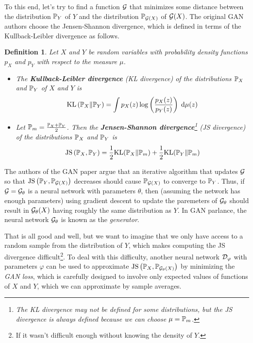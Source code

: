 \documentclass{article}
\newcommand{\dee}{\;\mathrm{d}}
\newtheorem{defn}{Definition}
\begin{document}
	\newcommand{\jsd}{\mathrm{JS}}
	\newcommand{\kld}{\mathrm{KL}}
	To this end, let's try to find a function \(\mathcal{G}\) that minimizes some distance between the distribution \(\mathbb{P}_Y\) of \(Y\) and the distribution \(\mathbb{P}_{\mathcal{G}(X)}\) of \(\mathcal{G}(X)\). The original GAN authors \cite{GAN} choose the Jensen-Shannon divergence, which is defined in terms of the Kullback-Leibler divergence as follows.
	\begin{defn}\label{def:kl_js_divergence}
		Let \(X\) and \(Y\) be random variables with probability density functions \(p_X\) and \(p_Y\) with respect to the measure \(\mu\).
		\begin{itemize}
			\item The \textbf{Kullback-Leibler divergence} (KL divergence) of the distributions \(\mathbb{P}_X\) and \(\mathbb{P}_Y\) of \(X\) and \(Y\) is
			\begin{equation}\label{eq:kl_div}
				\kld\left(\prob_X \Vert \prob_Y\right) = \int p_X(z) \log\left(\frac{p_X(z)}{p_Y(z)}\right) \dee \mu(z)
			\end{equation}
			\item Let \(\mathbb{P}_m = \frac{\mathbb{P}_X + \mathbb{P}_Y}{2}\). Then the \textbf{Jensen-Shannon divergence}\footnote{The KL divergence may not be defined for some distributions, but the JS divergence is always defined because we can choose \(\mu = \mathbb{P}_m\).} (JS divergence) of the distributions \(\mathbb{P}_X\) and \(\mathbb{P}_Y\) is
			\begin{equation}\label{eq:js_div}
				\jsd\left(\prob_X, \prob_Y\right) = \frac{1}{2}\kld(\prob_X \Vert\prob_m) + \frac{1}{2}\kld(\prob_Y \Vert \prob_m)
			\end{equation}
		\end{itemize}
	\end{defn}
	The authors of the GAN paper argue that an iterative algorithm that updates \(\mathcal{G}\) so that \(\jsd\left(\prob_Y, \prob_{\generator(X)}\right)\) decreases should cause \(\mathbb{P}_{\mathcal{G}(X)}\) to converge to \(\mathbb{P}_Y\). Thus, if \(\mathcal{G} = \mathcal{G}_\theta\) is a neural network with parameters \(\theta\), then (assuming the network has enough parameters) using gradient descent to update the paremeters of \(\mathcal{G}_\theta\) should result in \(\mathcal{G}_\theta(X)\) having roughly the same distribution as \(Y\). In GAN parlance, the neural network \(\mathcal{G}_\theta\) is known as the \textit{generator}.
	
	That is all good and well, but we want to imagine that we only have access to a random sample from the distribution of \(Y\), which makes computing the JS divergence difficult\footnote{If it wasn't difficult enough without knowing the density of \(Y\).}. To deal with this difficulty, another neural network \(\mathcal{D}_\varphi\) with parameters \(\varphi\) can be used to approximate \(\jsd\left(\prob_X, \prob_{\generator_\theta(X)}\right)\) by minimizing the \textit{GAN loss}, which is carefully designed to involve only expected values of functions of \(X\) and \(Y\), which we can approximate by sample averages.
	
\end{document}
